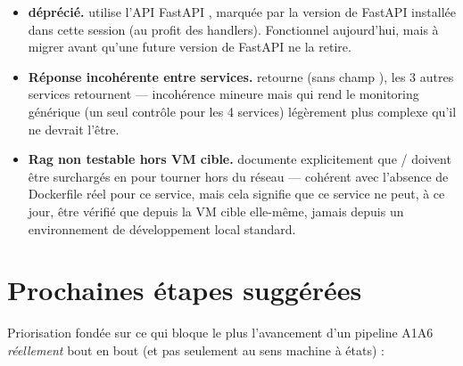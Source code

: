\documentclass[11pt,a4paper]{article}
\begin{document}
\begin{itemize}[leftmargin=1.3em]
\item \textbf{ d\'epr\'eci\'e.}  utilise l'API FastAPI , marqu\'ee  par la version de FastAPI install\'ee dans cette session (au profit des  handlers). Fonctionnel aujourd'hui, mais \`a migrer avant qu'une future version de FastAPI ne la retire.
\item \textbf{R\'eponse  incoh\'erente entre services.}  retourne  (sans champ ), les 3 autres services retournent  --- incoh\'erence mineure mais qui rend le monitoring g\'en\'erique (un seul contr\^ole pour les 4 services) l\'eg\`erement plus complexe qu'il ne devrait l'\^etre.
\item \textbf{Rag non testable hors VM cible.}  documente explicitement que / doivent \^etre surcharg\'es en  pour tourner hors du r\'eseau  --- coh\'erent avec l'absence de Dockerfile r\'eel pour ce service, mais cela signifie que ce service ne peut, \`a ce jour, \^etre v\'erifi\'e que depuis la VM cible elle-m\^eme, jamais depuis un environnement de d\'eveloppement local standard.
\end{itemize}

\section{Prochaines \'etapes sugg\'er\'ees}

Priorisation fond\'ee sur ce qui bloque le plus l'avancement d'un pipeline A1\textrightarrow A6 \emph{r\'eellement} bout en bout (et pas seulement au sens machine \`a \'etats) :
\end{document}
